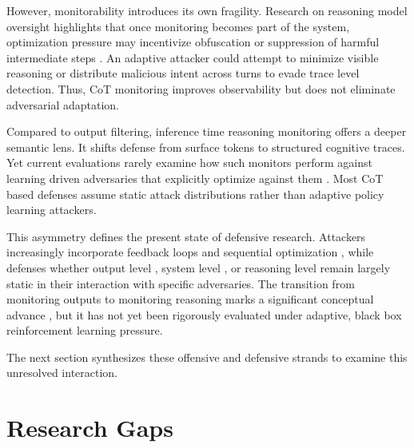 \documentclass[conference]{IEEEtran}
\begin{document}
However, monitorability introduces its own fragility. Research on reasoning model oversight highlights that once monitoring becomes part of the system, optimization pressure may incentivize obfuscation or suppression of harmful intermediate steps \cite{b7}. An adaptive attacker could attempt to minimize visible reasoning or distribute malicious intent across turns to evade trace level detection. Thus, CoT monitoring improves observability but does not eliminate adversarial adaptation.

Compared to output filtering, inference time reasoning monitoring offers a deeper semantic lens. It shifts defense from surface tokens to structured cognitive traces. Yet current evaluations rarely examine how such monitors perform against learning driven adversaries that explicitly optimize against them \cite{b14,b16}. Most CoT based defenses assume static attack distributions rather than adaptive policy learning attackers.

This asymmetry defines the present state of defensive research. Attackers increasingly incorporate feedback loops and sequential optimization \cite{b14,b15,b16}, while defenses whether output level \cite{b17,b18}, system level \cite{b19,b21,b22}, or reasoning level \cite{b23} remain largely static in their interaction with specific adversaries. The transition from monitoring outputs to monitoring reasoning marks a significant conceptual advance \cite{b6}, but it has not yet been rigorously evaluated under adaptive, black box reinforcement learning pressure.

The next section synthesizes these offensive and defensive strands to examine this unresolved interaction.

\section{Research Gaps}
\end{document}
